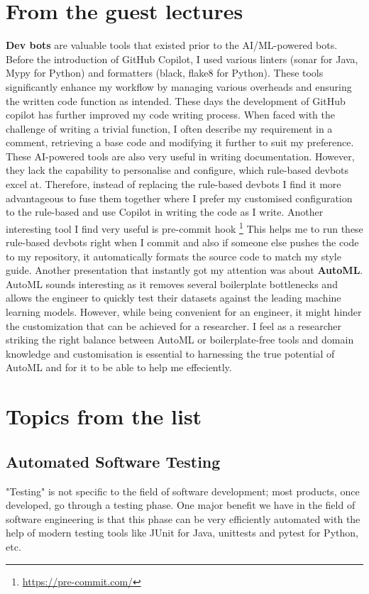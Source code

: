 \documentclass[11pt]{article}
\begin{document}
\section*{From the guest lectures}
\textbf{Dev bots} are valuable tools that existed prior to the AI/ML-powered bots. Before the introduction of GitHub Copilot, I used various linters (sonar for Java, Mypy for Python) and formatters (black, flake8 for Python). These tools significantly enhance my workflow by managing various overheads and ensuring the written code function as intended. These days the development of GitHub copilot has further improved my code writing process. When faced with the challenge of writing a trivial function, I often describe my requirement in a comment, retrieving a base code and modifying it further to suit my preference. These AI-powered tools are also very useful in writing documentation. However, they lack the capability to personalise and configure, which rule-based devbots excel at. Therefore, instead of replacing the rule-based devbots I find it more advantageous to fuse them together where I prefer my customised configuration to the rule-based and use Copilot in writing the code as I write. Another interesting tool I find very useful is pre-commit hook \footnote{\url{https://pre-commit.com/}} This helps me to run these rule-based devbots right when I commit and also if someone else pushes the code to my repository, it automatically formats the source code to match my style guide. 
Another presentation that instantly got my attention was about \textbf{AutoML}. AutoML sounds interesting as it removes several boilerplate bottlenecks and allows the engineer to quickly test their datasets against the leading machine learning models. However, while being convenient for an engineer, it might hinder the customization that can be achieved for a researcher. I feel as a researcher striking the right balance between AutoML or boilerplate-free tools and domain knowledge and customisation is essential to harnessing the true potential of AutoML and for it to be able to help me effeciently.

\section*{Topics from the list}
\subsection*{Automated Software Testing}
"Testing" is not specific to the field of software development; most products, once developed, go through a testing phase. One major benefit we have in the field of software engineering is that this phase can be very efficiently automated with the help of modern testing tools like JUnit for Java, unittests and pytest for Python, etc. 
\end{document}
